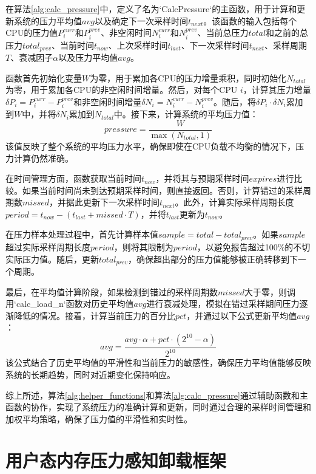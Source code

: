 在算法\ref{alg:calc_pressure}中，定义了名为`CalcPressure`的主函数，用于计算和更新系统的压力平均值\(avg\)以及确定下一次采样时间\(t_{next}\)。该函数的输入包括每个CPU的压力值\(P_i^{curr}\)和\(P_i^{prev}\)、非空闲时间\(N_i^{curr}\)和\(N_i^{prev}\)、当前总压力\(total\)和之前的总压力\(total_{prev}\)、当前时间\(t_{now}\)、上次采样时间\(t_{last}\)、下一次采样时间\(t_{next}\)、采样周期\(T\)、衰减因子\(\alpha\)以及压力平均值\(avg\)。

函数首先初始化变量\(W\)为零，用于累加各CPU的压力增量乘积，同时初始化\(N_{total}\)为零，用于累加各CPU的非空闲时间增量。然后，对每个CPU \(i\)，计算其压力增量\(\delta P_i = P_i^{curr} - P_i^{prev}\)和非空闲时间增量\(\delta N_i = N_i^{curr} - N_i^{prev}\)。随后，将\(\delta P_i \cdot \delta N_i\)累加到\(W\)中，并将\(\delta N_i\)累加到\(N_{total}\)中。接下来，计算系统的平均压力值：
\[
pressure = \frac{W}{\max(N_{total}, 1)}
\]
该值反映了整个系统的平均压力水平，确保即使在CPU负载不均衡的情况下，压力计算仍然准确。

在时间管理方面，函数获取当前时间\(t_{now}\)，并将其与预期采样时间\(expires\)进行比较。如果当前时间尚未到达预期采样时间，则直接返回。否则，计算错过的采样周期数\(missed\)，并据此更新下一次采样时间\(t_{next}\)。此外，计算实际采样周期长度\(period = t_{now} - (t_{last} + missed \cdot T)\)，并将\(t_{last}\)更新为\(t_{now}\)。

在压力样本处理过程中，首先计算样本值\(sample = total - total_{prev}\)。如果\(sample\)超过实际采样周期长度\(period\)，则将其限制为\(period\)，以避免报告超过100\%的不切实际压力值。随后，更新\(total_{prev}\)，确保超出部分的压力值能够被正确转移到下一个周期。

最后，在平均值计算阶段，如果检测到错过的采样周期数\(missed\)大于零，则调用`calc\_load\_n`函数对历史平均值\(avg\)进行衰减处理，模拟在错过采样期间压力逐渐降低的情况。接着，计算当前压力的百分比\(pct\)，并通过以下公式更新平均值\(avg\)：
\[
avg = \frac{avg \cdot \alpha + pct \cdot (2^{10} - \alpha)}{2^{10}}
\]
该公式结合了历史平均值的平滑性和当前压力的敏感性，确保压力平均值能够反映系统的长期趋势，同时对近期变化保持响应。

综上所述，算法\ref{alg:helper_functions}和算法\ref{alg:calc_pressure}通过辅助函数和主函数的协作，实现了系统压力的准确计算和更新，同时通过合理的采样时间管理和加权平均策略，确保了压力值的平滑性和实时性。


\section{用户态内存压力感知卸载框架}

